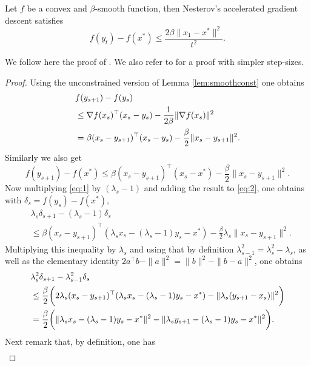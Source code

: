 \begin{theorem}
Let $f$ be a convex and $\beta$-smooth function, then Nesterov's accelerated gradient descent satisfies
$$f(y_t) - f(x^*) \leq \frac{2 \beta \|x_1 - x^*\|^2}{t^2} .$$
\end{theorem}

We follow here the proof of \cite{BT09}. We also refer to \cite{Tse08} for a proof with simpler step-sizes.

\begin{proof}
Using the unconstrained version of Lemma \ref{lem:smoothconst} one obtains
\begin{align}
& f(y_{s+1}) - f(y_s) \notag \\
& \leq \nabla f(x_s)^{\top} (x_s-y_s) - \frac{1}{2 \beta} \| \nabla f(x_s) \|^2 \notag \\
& = \beta (x_s - y_{s+1})^{\top} (x_s-y_s) - \frac{\beta}{2} \| x_s - y_{s+1} \|^2 . \label{eq:1}
\end{align}
Similarly we also get
\begin{equation} \label{eq:2}
f(y_{s+1}) - f(x^*) \leq \beta (x_s - y_{s+1})^{\top} (x_s-x^*) - \frac{\beta}{2} \| x_s - y_{s+1} \|^2 .
\end{equation}
Now multiplying \eqref{eq:1} by $(\lambda_{s}-1)$ and adding the result to \eqref{eq:2}, one obtains with $\delta_s = f(y_s) - f(x^*)$,
\begin{align*}
& \lambda_{s} \delta_{s+1} - (\lambda_{s} - 1) \delta_s \\
& \leq \beta (x_s - y_{s+1})^{\top} (\lambda_{s} x_{s} - (\lambda_{s} - 1) y_s-x^*) - \frac{\beta}{2} \lambda_{s} \| x_s - y_{s+1} \|^2.
\end{align*}
Multiplying this inequality by $\lambda_{s}$ and using that by definition $\lambda_{s-1}^2 = \lambda_{s}^2 - \lambda_{s}$, as well as the elementary identity $2 a^{\top} b -  \|a\|^2 = \|b\|^2 - \|b-a\|^2$, one obtains
\begin{align}
& \lambda_{s}^2 \delta_{s+1} - \lambda_{s-1}^2 \delta_s \notag \\
& \leq \frac{\beta}{2} \bigg( 2 \lambda_{s} (x_s - y_{s+1})^{\top} (\lambda_{s} x_{s} - (\lambda_{s} - 1) y_s-x^*) - \|\lambda_{s}( y_{s+1} - x_s  )\|^2\bigg) \notag \\
& = \frac{\beta}{2} \bigg(\| \lambda_{s} x_{s} - (\lambda_{s} - 1) y_{s}-x^* \|^2 - \| \lambda_{s} y_{s+1} - (\lambda_{s} - 1) y_{s}-x^* \|^2 \bigg). \label{eq:3}
\end{align}
Next remark that, by definition, one has 
\begin{align}

\end{align}
\end{proof}
